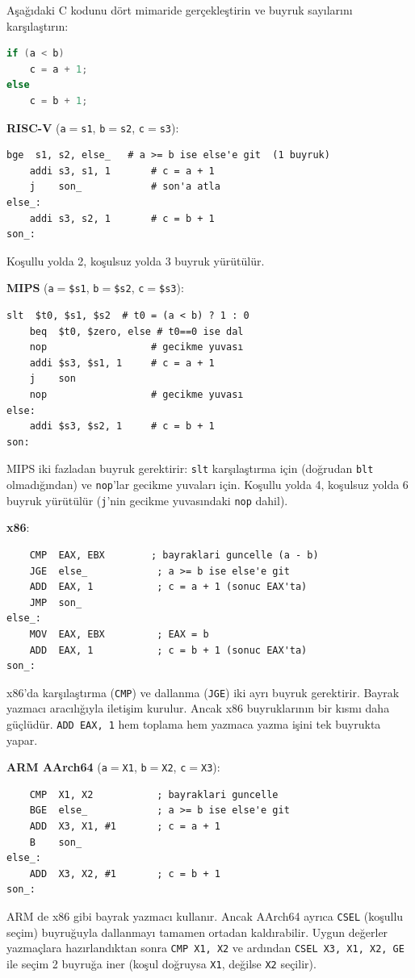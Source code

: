 \begin{ornek}[3.17]
\label{orn:dallanma-karsilastirma}
Aşağıdaki C kodunu dört mimaride gerçekleştirin ve buyruk sayılarını karşılaştırın:
\begin{lstlisting}[language=C]
if (a < b)
    c = a + 1;
else
    c = b + 1;
\end{lstlisting}

\textbf{RISC-V} (\texttt{a}$=$\texttt{s1}, \texttt{b}$=$\texttt{s2}, \texttt{c}$=$\texttt{s3}):
\begin{lstlisting}[style=riscv]
    bge  s1, s2, else_   # a >= b ise else'e git  (1 buyruk)
    addi s3, s1, 1       # c = a + 1
    j    son_            # son'a atla
else_:
    addi s3, s2, 1       # c = b + 1
son_:
\end{lstlisting}
Koşullu yolda 2, koşulsuz yolda 3 buyruk yürütülür.

\textbf{MIPS} (\texttt{a}$=$\texttt{\$s1}, \texttt{b}$=$\texttt{\$s2}, \texttt{c}$=$\texttt{\$s3}):
\begin{lstlisting}[style=mips]
    slt  $t0, $s1, $s2  # t0 = (a < b) ? 1 : 0
    beq  $t0, $zero, else # t0==0 ise dal
    nop                  # gecikme yuvası
    addi $s3, $s1, 1     # c = a + 1
    j    son
    nop                  # gecikme yuvası
else:
    addi $s3, $s2, 1     # c = b + 1
son:
\end{lstlisting}
MIPS iki fazladan buyruk gerektirir: \texttt{slt} karşılaştırma için (doğrudan \texttt{blt} olmadığından) ve \texttt{nop}'lar gecikme yuvaları için. Koşullu yolda 4, koşulsuz yolda 6 buyruk yürütülür (\texttt{j}'nin gecikme yuvasındaki \texttt{nop} dahil).

\textbf{x86}:
\begin{lstlisting}
    CMP  EAX, EBX        ; bayraklari guncelle (a - b)
    JGE  else_            ; a >= b ise else'e git
    ADD  EAX, 1           ; c = a + 1 (sonuc EAX'ta)
    JMP  son_
else_:
    MOV  EAX, EBX         ; EAX = b
    ADD  EAX, 1           ; c = b + 1 (sonuc EAX'ta)
son_:
\end{lstlisting}
x86'da karşılaştırma (\texttt{CMP}) ve dallanma (\texttt{JGE}) iki ayrı buyruk gerektirir. Bayrak yazmacı aracılığıyla iletişim kurulur. Ancak x86 buyruklarının bir kısmı daha güçlüdür. \texttt{ADD EAX, 1} hem toplama hem yazmaca yazma işini tek buyrukta yapar.

\textbf{ARM AArch64} (\texttt{a}$=$\texttt{X1}, \texttt{b}$=$\texttt{X2}, \texttt{c}$=$\texttt{X3}):
\begin{lstlisting}
    CMP  X1, X2           ; bayraklari guncelle
    BGE  else_            ; a >= b ise else'e git
    ADD  X3, X1, #1       ; c = a + 1
    B    son_
else_:
    ADD  X3, X2, #1       ; c = b + 1
son_:
\end{lstlisting}
ARM de x86 gibi bayrak yazmacı kullanır. Ancak AArch64 ayrıca \texttt{CSEL} (koşullu seçim) buyruğuyla dallanmayı tamamen ortadan kaldırabilir. Uygun değerler yazmaçlara hazırlandıktan sonra \texttt{CMP X1, X2} ve ardından \texttt{CSEL X3, X1, X2, GE} ile seçim 2 buyruğa iner (koşul doğruysa \texttt{X1}, değilse \texttt{X2} seçilir).
\end{ornek}

